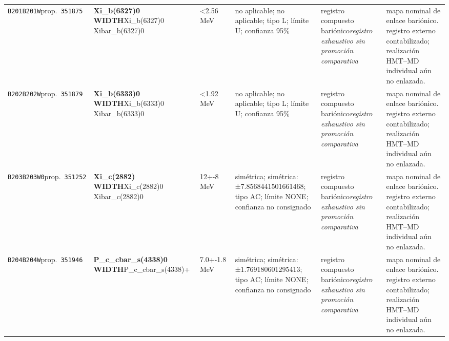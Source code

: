\begin{landscape}
\begin{longtable}{L{1.85cm}L{4.45cm}L{2.35cm}L{4.05cm}L{3.35cm}L{7.15cm}}
\texttt{B201}\newline \texttt{B201W}\newline prop.\ \texttt{351875} & \textbf{Xi\_\allowbreak{}b(6327)0 WIDTH}\newline Xi\_\allowbreak{}b(6327)0 \textbar{}\allowbreak{} Xibar\_\allowbreak{}b(6327)0 & \textless{}2.56\,MeV & no aplicable; no aplicable; tipo L; límite U; confianza 95\% & registro compuesto bariónico\newline \emph{registro exhaustivo sin promoción comparativa} & mapa nominal de enlace bariónico. registro externo contabilizado; realización HMT--MD individual aún no enlazada. \\
\texttt{B202}\newline \texttt{B202W}\newline prop.\ \texttt{351879} & \textbf{Xi\_\allowbreak{}b(6333)0 WIDTH}\newline Xi\_\allowbreak{}b(6333)0 \textbar{}\allowbreak{} Xibar\_\allowbreak{}b(6333)0 & \textless{}1.92\,MeV & no aplicable; no aplicable; tipo L; límite U; confianza 95\% & registro compuesto bariónico\newline \emph{registro exhaustivo sin promoción comparativa} & mapa nominal de enlace bariónico. registro externo contabilizado; realización HMT--MD individual aún no enlazada. \\
\texttt{B203}\newline \texttt{B203W0}\newline prop.\ \texttt{351252} & \textbf{Xi\_\allowbreak{}c(2882) WIDTH}\newline Xi\_\allowbreak{}c(2882)0 \textbar{}\allowbreak{} Xibar\_\allowbreak{}c(2882)0 & 12+-8\,MeV & simétrica; simétrica: ±7.8568441501661468; tipo AC; límite NONE; confianza no consignado & registro compuesto bariónico\newline \emph{registro exhaustivo sin promoción comparativa} & mapa nominal de enlace bariónico. registro externo contabilizado; realización HMT--MD individual aún no enlazada. \\
\texttt{B204}\newline \texttt{B204W}\newline prop.\ \texttt{351946} & \textbf{P\_\allowbreak{}c\_\allowbreak{}cbar\_\allowbreak{}s(4338)0 WIDTH}\newline P\_\allowbreak{}c\_\allowbreak{}cbar\_\allowbreak{}s(4338)+ & 7.0+-1.8\,MeV & simétrica; simétrica: ±1.769180601295413; tipo AC; límite NONE; confianza no consignado & registro compuesto bariónico\newline \emph{registro exhaustivo sin promoción comparativa} & mapa nominal de enlace bariónico. registro externo contabilizado; realización HMT--MD individual aún no enlazada. \\

\end{longtable}
\end{landscape}
